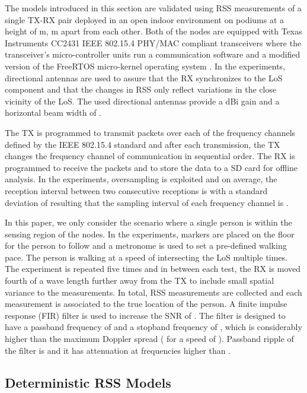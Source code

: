 \documentclass[journal, 10pt, twocolumn, balance]{IEEEtran}
\begin{document}
The models introduced in this section are validated using RSS measurements of a single TX-RX pair deployed in an open indoor environment on podiums at a height of  m,  m apart from each other. Both of the nodes are equipped with Texas Instruments CC2431 IEEE 802.15.4 PHY/MAC compliant  transceivers \cite{CC2430} where the transceiver's micro-controller units run a communication software and a modified version of the FreeRTOS micro-kernel operating system \cite{Freertos}. In the experiments, directional antennas are used to assure that the RX synchronizes to the LoS component and that the changes in RSS only reflect variations in the close vicinity of the LoS. The used directional antennas provide a  dBi gain and a horizontal beam width of  \cite{lcom}.

The TX is programmed to transmit packets over each of the  frequency channels defined by the IEEE 802.15.4 standard \cite{802_15_4} and after each transmission, the TX changes the frequency channel of communication in sequential order. The RX is programmed to receive the packets and to store the data to a SD card for offline analysis. In the experiments, oversampling is exploited and on average, the reception interval between two consecutive receptions is  with a standard deviation of  resulting that the sampling interval  of each frequency channel is . 

In this paper, we only consider the scenario where a single person is within the sensing region of the nodes. In the experiments, markers are placed on the floor for the person to follow and a metronome is used to set a pre-defined walking pace. The person is walking at a speed of  intersecting the LoS multiple times. The experiment is repeated five times and in between each test, the RX is moved fourth of a wave length  further away from the TX to include small spatial variance to the measurements. In total,  RSS measurements are collected and each measurement is associated to the true location of the person. A finite impulse response (FIR) filter is used to increase the SNR of . The filter is designed to have a passband frequency of  and a stopband frequency of , which is considerably higher than the maximum Doppler spread ( for a speed of ). Passband ripple of the filter is  and it has  attenuation at frequencies higher than .



\subsection{Deterministic RSS Models}\label{S:deterministic_models}
\end{document}
